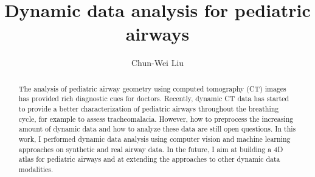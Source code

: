 \documentclass{article}
\begin{document}
%
%
%
%
\title{Dynamic data analysis for pediatric airways}
%
%
\author{Chun-Wei Liu}
%
%
%


\maketitle              %

\begin{abstract}
The analysis of pediatric airway geometry using computed tomography (CT) images has provided rich diagnostic cues for doctors. Recently, dynamic CT data has started to provide a better characterization of pediatric airways throughout the breathing cycle, for example to assess tracheomalacia. However, how to preprocess the increasing amount of dynamic data and how to analyze these data are still open questions. In this work, I performed dynamic data analysis using computer vision and machine learning approaches on synthetic and real airway data. In the future, I aim at building a 4D atlas for pediatric airways and at extending the approaches to other dynamic data modalities.
\end{abstract}








\end{document}
